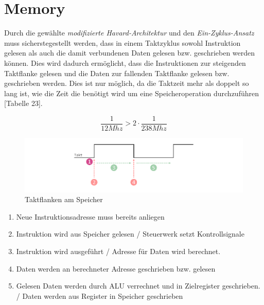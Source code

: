     \section{Memory}\label{lab:memory}

        Durch die gewählte \textit{modifizierte Havard-Architektur} und den \textit{Ein-Zyklus-Ansatz}
        muss sicherstegestellt werden, dass in einem Taktzyklus sowohl Instruktion gelesen als auch die damit verbundenen Daten
        gelesen bzw. geschrieben werden können. Dies wird dadurch ermöglicht, dass die Instruktionen zur steigenden Taktflanke
        gelesen und die Daten zur fallenden Taktflanke gelesen bzw. geschrieben werden.
        Dies ist nur möglich, da die Taktzeit mehr als doppelt so lang ist, wie die Zeit die benötigt wird um eine Speicheroperation
        durchzuführen \cite{intel-cyc10lp-device-datasheet}[Tabelle 23].

        \begin{equation}
            \frac{1}{12Mhz} > 2\cdot\frac{1}{238Mhz}
        \end{equation}


        \begin{figure}[H]
            \centering
            \includegraphics[scale=1]{img/Timing_Memory.pdf}
            \caption{Taktflanken am Speicher}
            \label{fig:timing_memory}
        \end{figure}

         \begin{enumerate}
             \item Neue Instruktionsadresse muss bereits anliegen
             \item Instruktion wird aus Speicher gelesen / Steuerwerk setzt Kontrollsignale
             \item Instruktion wird ausgeführt / Adresse für Daten wird berechnet.
             \item Daten werden an berechneter Adresse geschrieben bzw. gelesen
             \item Gelesen Daten werden durch ALU verrechnet und in Zielregister geschrieben. / Daten werden aus Register in Speicher geschrieben
         \end{enumerate}

